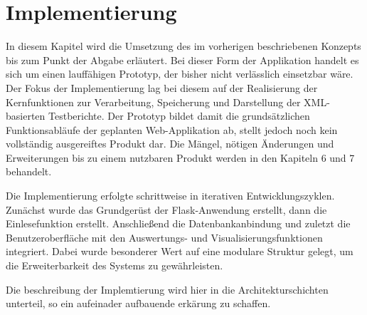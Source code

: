 \section{Implementierung}
\label{sec:implementierung}


In diesem Kapitel wird die Umsetzung des im vorherigen beschriebenen Konzepts bis zum Punkt der Abgabe erläutert.
Bei dieser Form der Applikation handelt es sich um einen lauffähigen Prototyp, der bisher nicht verlässlich einsetzbar wäre.
Der Fokus der Implementierung lag bei diesem auf der Realisierung der Kernfunktionen zur Verarbeitung, Speicherung und Darstellung der XML-basierten Testberichte.
Der Prototyp bildet damit die grundsätzlichen Funktionsabläufe der geplanten Web-Applikation ab, stellt jedoch noch kein vollständig ausgereiftes Produkt dar.
Die Mängel, nötigen Änderungen und Erweiterungen bis zu einem nutzbaren Produkt werden in den Kapiteln 6 und 7 behandelt.

Die Implementierung erfolgte schrittweise in iterativen Entwicklungszyklen.
Zunächst wurde das Grundgerüst der Flask-Anwendung erstellt, dann die Einlesefunktion erstellt.
Anschließend die Datenbankanbindung und zuletzt die Benutzeroberfläche mit den Auswertungs- und Visualisierungsfunktionen integriert.
Dabei wurde besonderer Wert auf eine modulare Struktur gelegt, um die Erweiterbarkeit des Systems zu gewährleisten.

Die beschreibung der Implemtierung wird hier in die Architekturschichten unterteil, so ein aufeinader aufbauende erkärung zu schaffen.







